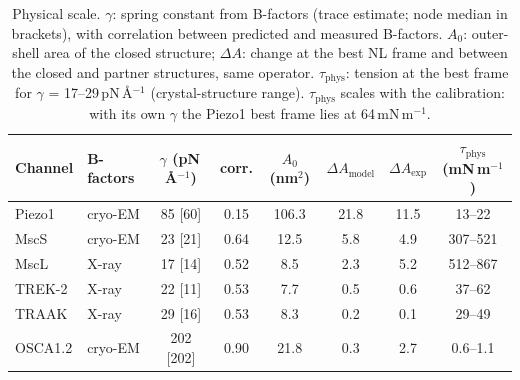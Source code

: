 \begin{table}[!h]
\centering\small
\caption{Physical scale. $\gamma$: spring constant from B-factors (trace estimate; node median in brackets), with correlation between predicted and measured B-factors. $A_0$: outer-shell area of the closed structure; $\Delta A$: change at the best NL frame and between the closed and partner structures, same operator. $\tau_{\mathrm{phys}}$: tension at the best frame for $\gamma$ = 17--29\,pN\,\AA$^{-1}$ (crystal-structure range). $\tau_{\mathrm{phys}}$ scales with the calibration: with its own $\gamma$ the Piezo1 best frame lies at 64\,mN\,m$^{-1}$.}
\label{tab:phys}
\setlength{\tabcolsep}{4pt}
\begin{tabular}{llcccccc}
\toprule
Channel & B-factors & $\gamma$ (pN\,\AA$^{-1}$) & corr. & $A_0$ (nm$^2$) & $\Delta A_{\mathrm{model}}$ & $\Delta A_{\mathrm{exp}}$ & $\tau_{\mathrm{phys}}$ (mN\,m$^{-1}$)\\
\midrule
Piezo1 & cryo-EM & 85 [60] & 0.15 & 106.3 & 21.8 & 11.5 & 13--22\\
MscS & cryo-EM & 23 [21] & 0.64 & 12.5 & 5.8 & 4.9 & 307--521\\
MscL & X-ray & 17 [14] & 0.52 & 8.5 & 2.3 & 5.2 & 512--867\\
TREK-2 & X-ray & 22 [11] & 0.53 & 7.7 & 0.5 & 0.6 & 37--62\\
TRAAK & X-ray & 29 [16] & 0.53 & 8.3 & 0.2 & 0.1 & 29--49\\
OSCA1.2 & cryo-EM & 202 [202] & 0.90 & 21.8 & 0.3 & 2.7 & 0.6--1.1\\
\bottomrule
\end{tabular}
\end{table}
